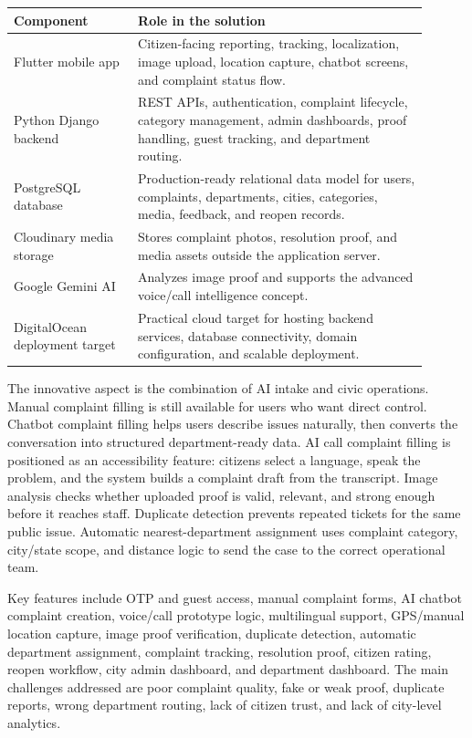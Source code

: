 \documentclass[11pt,a4paper]{article}
\begin{document}
\begin{center}
\begin{tabular}{p{0.27\linewidth}p{0.63\linewidth}}
\toprule
\textbf{Component} & \textbf{Role in the solution} \\
\midrule
Flutter mobile app & Citizen-facing reporting, tracking, localization, image upload, location capture, chatbot screens, and complaint status flow. \\
Python Django backend & REST APIs, authentication, complaint lifecycle, category management, admin dashboards, proof handling, guest tracking, and department routing. \\
PostgreSQL database & Production-ready relational data model for users, complaints, departments, cities, categories, media, feedback, and reopen records. \\
Cloudinary media storage & Stores complaint photos, resolution proof, and media assets outside the application server. \\
Google Gemini AI & Analyzes image proof and supports the advanced voice/call intelligence concept. \\
DigitalOcean deployment target & Practical cloud target for hosting backend services, database connectivity, domain configuration, and scalable deployment. \\
\bottomrule
\end{tabular}
\end{center}

The innovative aspect is the combination of AI intake and civic operations. Manual complaint filling is still available for users who want direct control. Chatbot complaint filling helps users describe issues naturally, then converts the conversation into structured department-ready data. AI call complaint filling is positioned as an accessibility feature: citizens select a language, speak the problem, and the system builds a complaint draft from the transcript. Image analysis checks whether uploaded proof is valid, relevant, and strong enough before it reaches staff. Duplicate detection prevents repeated tickets for the same public issue. Automatic nearest-department assignment uses complaint category, city/state scope, and distance logic to send the case to the correct operational team.

Key features include OTP and guest access, manual complaint forms, AI chatbot complaint creation, voice/call prototype logic, multilingual support, GPS/manual location capture, image proof verification, duplicate detection, automatic department assignment, complaint tracking, resolution proof, citizen rating, reopen workflow, city admin dashboard, and department dashboard. The main challenges addressed are poor complaint quality, fake or weak proof, duplicate reports, wrong department routing, lack of citizen trust, and lack of city-level analytics.
\end{document}
